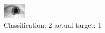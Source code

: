 \begin{figure}[h!]
\begin{center}
\includegraphics[width=0.60\columnwidth]{figures/ID1560_class_2_target_1.png}
\end{center}
\caption{ Classification: 2 actual target: 1}
\label{fig:ID1560_class_2_target_1}
\end{figure}
